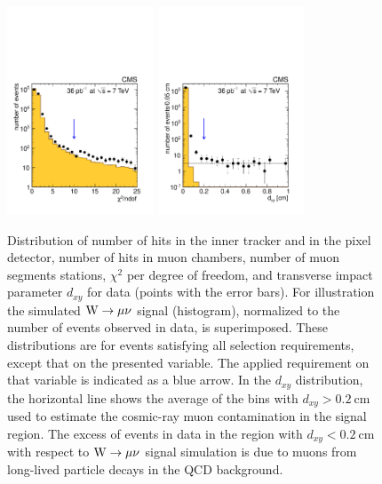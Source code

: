 \begin{figure}
\begin{center}
   \includegraphics[width=0.39\textwidth]{figs/chi2_log.pdf}
   \includegraphics[width=0.39\textwidth]{figs/dxy_log.pdf}
   \caption{ \label{fig:muonIDvars}
Distribution of number of hits in the inner tracker and in the pixel detector,
number of hits in muon chambers, number of muon segments stations,
$\chi^2$ per degree of freedom, and transverse impact parameter $d_{xy}$ for data
(points with the error bars).
For illustration the simulated $\mathrm{W} \rightarrow \mu\nu$ signal (histogram), normalized to the number of events 
observed in data, is superimposed.
These distributions are for events
satisfying all selection requirements, except that on
the presented variable.
The applied requirement on that variable is indicated as a blue arrow.
In the $d_{xy}$ distribution, the horizontal line shows the average of the 
bins with  $d_{xy}>0.2~\mathrm{cm}$
used to estimate the cosmic-ray muon contamination in the signal region.
The excess of events in data in the region with $d_{xy}<0.2~\mathrm{cm}$ with respect to $\mathrm{W} \rightarrow \mu\nu$ 
signal simulation is due to muons from long-lived
particle decays in the QCD background.
}
  \end{center}
\end{figure}

